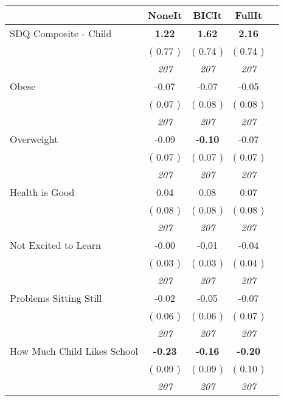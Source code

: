 \begin{tabular}{l c c c c}
\toprule
 & NoneIt & BICIt & FullIt \\
\midrule
SDQ Composite - Child & \textbf{      1.22 } & \textbf{      1.62 } & \textbf{      2.16 } \\
& (     0.77 ) & (     0.74 ) & (     0.74 ) \\
& \textit{ 207 } & \textit{ 207 } & \textit{ 207 } \\
Obese &     -0.07 &     -0.07 &     -0.05 \\
& (     0.07 ) & (     0.08 ) & (     0.08 ) \\
& \textit{ 207 } & \textit{ 207 } & \textit{ 207 } \\
Overweight &     -0.09 & \textbf{     -0.10 } &     -0.07 \\
& (     0.07 ) & (     0.07 ) & (     0.07 ) \\
& \textit{ 207 } & \textit{ 207 } & \textit{ 207 } \\
Health is Good &      0.04 &      0.08 &      0.07 \\
& (     0.08 ) & (     0.08 ) & (     0.08 ) \\
& \textit{ 207 } & \textit{ 207 } & \textit{ 207 } \\
Not Excited to Learn &     -0.00 &     -0.01 &     -0.04 \\
& (     0.03 ) & (     0.03 ) & (     0.04 ) \\
& \textit{ 207 } & \textit{ 207 } & \textit{ 207 } \\
Problems Sitting Still &     -0.02 &     -0.05 &     -0.07 \\
& (     0.06 ) & (     0.06 ) & (     0.07 ) \\
& \textit{ 207 } & \textit{ 207 } & \textit{ 207 } \\
How Much Child Likes School & \textbf{     -0.23 } & \textbf{     -0.16 } & \textbf{     -0.20 } \\
& (     0.09 ) & (     0.09 ) & (     0.10 ) \\
& \textit{ 207 } & \textit{ 207 } & \textit{ 207 } \\
\bottomrule
\end{tabular}
